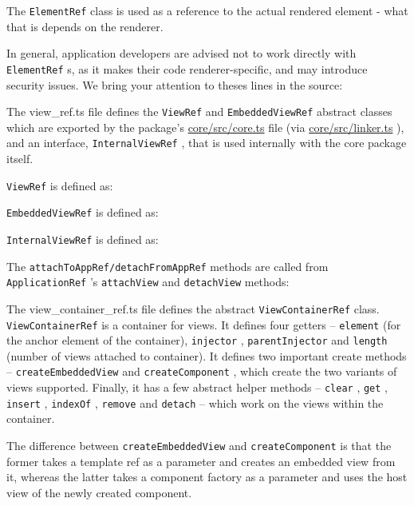 The
\texttt{ElementRef}
class is used as a reference to the actual rendered element - what
that is depends on the renderer.



In general, application developers are advised not to work directly with
\texttt{ElementRef}
s,
as it makes their code renderer-specific, and may introduce security issues. We bring
your attention to theses lines in the source:



The view\_ref.ts file defines the
\texttt{ViewRef}
and
\texttt{EmbeddedViewRef}
abstract classes which
are exported by the package’s
\url{core/src/core.ts}
file (via
\url{core/src/linker.ts}
), and an
interface,
\texttt{InternalViewRef}
, that is used internally with the core package itself.

\texttt{ViewRef}
is defined as:



\texttt{EmbeddedViewRef}
is defined as:



\texttt{InternalViewRef}
is defined as:



The
\texttt{attachToAppRef/detachFromAppRef}
methods are called from
\texttt{ApplicationRef}
’s
\texttt{attachView}
and
\texttt{detachView}
methods:



The view\_container\_ref.ts file defines the abstract
\texttt{ViewContainerRef}
class.
\texttt{ViewContainerRef}
is a container for views. It defines four getters –
\texttt{element}
(for the
anchor element of the container),
\texttt{injector}
,
\texttt{parentInjector}
and
\texttt{length}
(number of
views attached to container). It defines two important create methods –
\texttt{createEmbeddedView}
and
\texttt{createComponent}
, which create the two variants of views
supported. Finally, it has a few abstract helper methods –
\texttt{clear}
,
\texttt{get}
,
\texttt{insert}
,
\texttt{indexOf}
,
\texttt{remove}
and
\texttt{detach}
– which work on the views within the container.



The difference between
\texttt{createEmbeddedView}
and
\texttt{createComponent}
is that the former
takes a template ref as a parameter and creates an embedded view from it, whereas
the latter takes a component factory as a parameter and uses the host view of the
newly created component.


